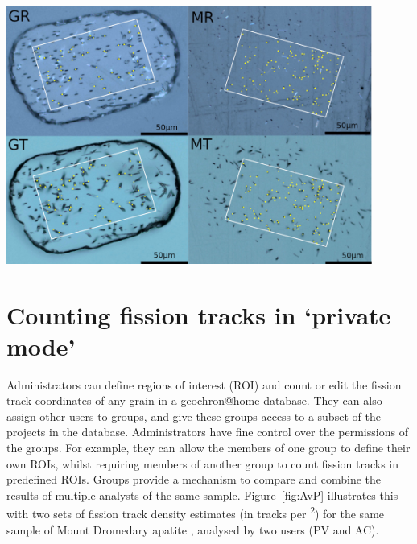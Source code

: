\documentclass[gchron, manuscript]{copernicus}
\begin{document}
{ \centering \includegraphics[width=12cm]{EDM.jpg}
  \label{fig:EDM}
}%

\section{Counting fission tracks in `private mode'}\label{sec:private}

Administrators can define regions of interest (ROI) and count or edit
the fission track coordinates of any grain in a geochron@home
database. They can also assign other users to groups, and give these
groups access to a subset of the projects in the
database. Administrators have fine control over the permissions of the
groups. For example, they can allow the members of one group to define
their own ROIs, whilst requiring members of another group to count
fission tracks in predefined ROIs.  Groups provide a mechanism to
compare and combine the results of multiple analysts of the same
sample. Figure~\ref{fig:AvP} illustrates this with two sets of fission
track density estimates (in tracks per \textsuperscript{2})
for the same sample of Mount Dromedary apatite \citep{green1985b},
analysed by two users (PV and AC).\medskip
\end{document}
